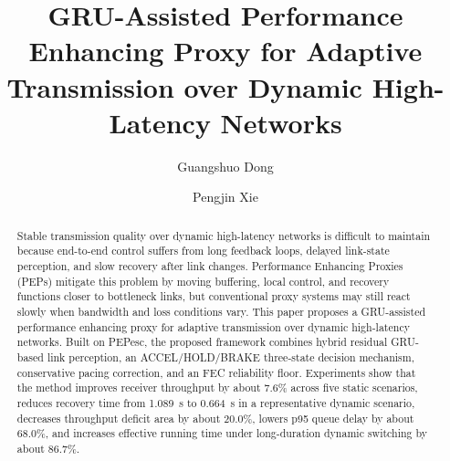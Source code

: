 \documentclass[runningheads]{llncs}
\begin{document}
\title{GRU-Assisted Performance Enhancing Proxy for Adaptive Transmission over Dynamic High-Latency Networks}


\author{Guangshuo Dong \and
Pengjin Xie}



\maketitle

\begin{abstract}
Stable transmission quality over dynamic high-latency networks is difficult to maintain because end-to-end control suffers from long feedback loops, delayed link-state perception, and slow recovery after link changes. Performance Enhancing Proxies (PEPs) mitigate this problem by moving buffering, local control, and recovery functions closer to bottleneck links, but conventional proxy systems may still react slowly when bandwidth and loss conditions vary. This paper proposes a GRU-assisted performance enhancing proxy for adaptive transmission over dynamic high-latency networks. Built on PEPesc, the proposed framework combines hybrid residual GRU-based link perception, an ACCEL/HOLD/BRAKE three-state decision mechanism, conservative pacing correction, and an FEC reliability floor. Experiments show that the method improves receiver throughput by about 7.6\% across five static scenarios, reduces recovery time from 1.089~s to 0.664~s in a representative dynamic scenario, decreases throughput deficit area by about 20.0\%, lowers p95 queue delay by about 68.0\%, and increases effective running time under long-duration dynamic switching by about 86.7\%.
\end{abstract}











\end{document}

